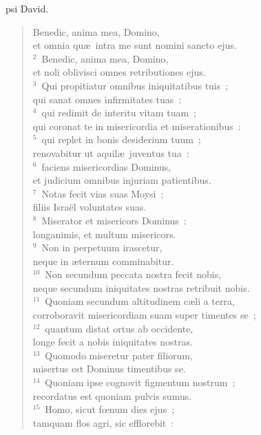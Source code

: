 \bchapter
{}psi David. \begin{flushleft}\begin{verse}\vspace{6pt}Benedic, anima mea, Domino,\\ et omnia qu\ae\ intra me sunt nomini sancto ejus.\\
${}^{2}$~Benedic, anima mea, Domino,\\ et noli oblivisci omnes retributiones ejus.\\
${}^{3}$~Qui propitiatur omnibus iniquitatibus tuis~;\\ qui sanat omnes infirmitates tuas~:\\
${}^{4}$~qui redimit de interitu vitam tuam~;\\ qui coronat te in misericordia et miserationibus~:\\
${}^{5}$~qui replet in bonis desiderium tuum~;\\ renovabitur ut aquil\ae\ juventus tua~:\\
${}^{6}$~faciens misericordias Dominus,\\ et judicium omnibus injuriam patientibus.\\
${}^{7}$~Notas fecit vias suas Moysi~;\\ filiis Isra\"el voluntates suas.\\
${}^{8}$~Miserator et misericors Dominus~:\\ longanimis, et multum misericors.\\
${}^{9}$~Non in perpetuum irascetur,\\ neque in \ae ternum comminabitur.\\
${}^{10}$~Non secundum peccata nostra fecit nobis,\\ neque secundum iniquitates nostras retribuit nobis.\\
${}^{11}$~Quoniam secundum altitudinem c\ae li a terra,\\ corroboravit misericordiam suam super timentes se~;\\
${}^{12}$~quantum distat ortus ab occidente,\\ longe fecit a nobis iniquitates nostras.\\
${}^{13}$~Quomodo miseretur pater filiorum,\\ misertus est Dominus timentibus se.\\
${}^{14}$~Quoniam ipse cognovit figmentum nostrum~;\\ recordatus est quoniam pulvis sumus.\\
${}^{15}$~Homo, sicut fœnum dies ejus~;\\ tamquam flos agri, sic efflorebit~:\\

\end{verse}
\end{flushleft}
